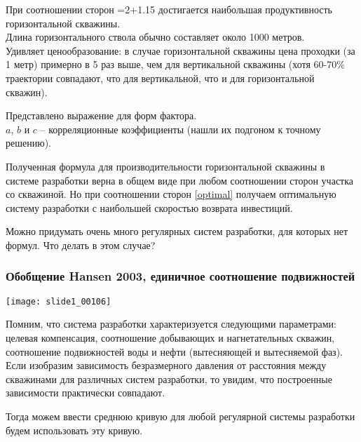\documentclass[main.tex]{subfiles}
\begin{document}
При соотношении сторон
\beq\label{optimal}
=2+1.15
\eeq
достигается наибольшая продуктивность горизонтальной скважины.\\

Длина горизонтального ствола обычно составляет около 1000 метров.\\

Удивляет ценообразование: в случае горизонтальной скважины цена проходки (за 1 метр) примерно в 5 раз выше, чем для вертикальной скважины (хотя 60-70\% траектории совпадают, что для вертикальной, что и для горизонтальной скважин).


Представлено выражение для форм фактора.\\

$a$, $b$ и $c$ -- корреляционные коэффициенты (нашли их подгоном к точному решению).

Полученная формула для производительности горизонтальной скважины в системе разработки верна в общем виде при любом соотношении сторон участка со скважиной. Но при соотношении сторон \eqref{optimal} получаем оптимальную систему разработки с наибольшей скоростью возврата инвестиций.



Можно придумать очень много регулярных систем разработки, для которых нет формул. Что делать в этом случае?

\subsubsection{Обобщение Hansen 2003, единичное соотношение подвижностей}

\texttt{[image: slide1\_00106]}

Помним, что система разработки характеризуется следующими параметрами: целевая компенсация, соотношение добывающих и нагнетательных скважин, соотношение подвижностей воды и нефти (вытесняющей и вытесняемой фаз).\\

Если изобразим зависимость безразмерного давления от расстояния между скважинами для различных систем разработки, то увидим, что построенные зависимости практически совпадают.

Тогда можем ввести среднюю кривую для любой регулярной системы разработки будем использовать эту кривую.\\
\end{document}
